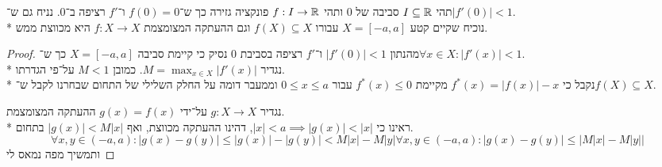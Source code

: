 \Question{}
תהי $I \subseteq \mathbb{R}$ סביבה של $0$ ותהי $f : I \to \mathbb{R}$ פונקציה גזירה כך ש־$f(0) = 0$ ו־$f'$ רציפה ב־$0$. נניח גם ש־$|f'(0)| < 1$. \\*
נוכיח שקיים קטע $X = [-a, a]$ עבורו $f(X) \subseteq X$ וגם ההעתקה המצומצמת $f : X \to X$ היא מכווצת ממש.
\begin{proof}
	מהנתון $|f'(0)| < 1$ ו־$f'$ רציפה בסביבת $0$ נסיק כי קיימת סביבה $X = [-a, a]$ כך ש־$\forall x \in X : |f'(x)| < 1$. \\*
	נגדיר $M = \max_{x \in X} |f'(x)|$. כמובן $M < 1$ על־פי הגדרתו. \\*
	נקבל כי $f^*(x) = |f(x)| - x$ מקיימת $f^*(x) \le 0$ עבור $0 \le x \le a$ וממעבר דומה על החלק השלילי של התחום שבחרנו לקבל ש־$f(X) \subseteq X$.

	נגדיר $g : X \to X$ על־ידי $g(x) = f(x)$ ההעתקה המצומצמת. \\*
	ראינו כי $|x| < a \implies |g(x)| < |x|$, דהינו ההעתקה מכווצת, ואף $|g(x)| < M|x|$ בתחום.
	\[
		\forall x, y \in (-a, a) : |g(x) - g(y)| \le |g(x)| - |g(y)| < M|x| - M|y|
		\forall x, y \in (-a, a) : |g(x) - g(y)| \le \left| M|x| - M|y| \right|
	\]
	ותמשיך מפה נמאס לי
\end{proof}

